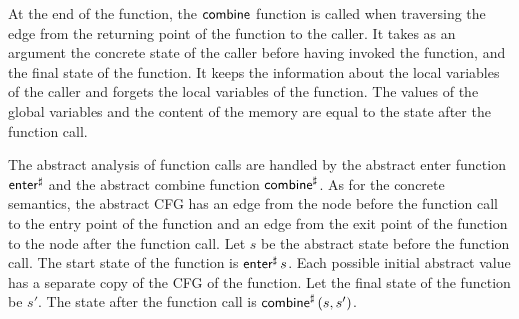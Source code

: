 At the end of the function, the $\textsf{combine}$ function is called when traversing the edge from the returning point of the function to the caller.
It takes as an argument the concrete state of the caller before having invoked the function,
and the final state of the function.
It keeps the information about the local variables of the caller and forgets the local variables of the function.
The values of the global variables and the content of the memory are equal to the state after the function call.

The abstract analysis of function calls are handled by the abstract enter function $\textsf{enter}^\sharp$ and the abstract combine function $\textsf{combine}^\sharp$.
As for the concrete semantics, the abstract CFG has an edge from the node before the function call to the entry point of the function and an edge from the exit point of the function to the node after the function call.
Let $s$ be the abstract state before the function call.
The start state of the function is $\textsf{enter}^\sharp\,s$.
Each possible initial abstract value has a separate copy of the CFG of the function.
Let the final state of the function be $s'$.
The state after the function call is $\textsf{combine}^\sharp\,(s,s')$.


